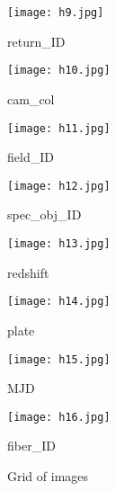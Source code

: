 \documentclass{article}
\begin{document}
\begin{figure}[H]
  \centering

  \begin{minipage}{0.49\textwidth}
    \centering
    \texttt{[image: h9.jpg]}
    \caption{return\_ID}
    \label{fig:image9}
  \end{minipage}\hfill
  \begin{minipage}{0.49\textwidth}
    \centering
    \texttt{[image: h10.jpg]}
    \caption{cam_col}
    \label{fig:image10}
  \end{minipage}

  \vspace{1em}

  \begin{minipage}{0.49\textwidth}
    \centering
    \texttt{[image: h11.jpg]}
    \caption{field\_ID}
    \label{fig:image11}
  \end{minipage}\hfill
  \begin{minipage}{0.49\textwidth}
    \centering
    \texttt{[image: h12.jpg]}
    \caption{spec\_obj\_ID}
    \label{fig:image12}
  \end{minipage}

  \vspace{1em}

  \begin{minipage}{0.49\textwidth}
    \centering
    \texttt{[image: h13.jpg]}
    \caption{redshift}
    \label{fig:image13}
  \end{minipage}\hfill
  \begin{minipage}{0.49\textwidth}
    \centering
    \texttt{[image: h14.jpg]}
    \caption{plate}
    \label{fig:image14}
  \end{minipage}

  \vspace{1em}

  \begin{minipage}{0.49\textwidth}
    \centering
    \texttt{[image: h15.jpg]}
    \caption{MJD}
    \label{fig:image15}
  \end{minipage}\hfill
  \begin{minipage}{0.49\textwidth}
    \centering
    \texttt{[image: h16.jpg]}
    \caption{fiber\_ID}
    \label{fig:image16}
  \end{minipage}

  \caption{Grid of images}
  \label{fig:grid}
\end{figure}
\end{document}

